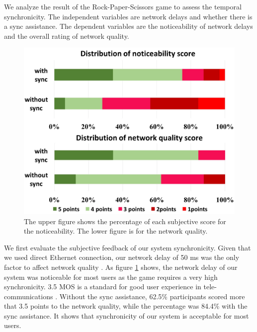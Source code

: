We analyze the result of the Rock-Paper-Scissors game to assess the temporal synchronicity. The independent variables are network delays and whether there is a sync assistance. The dependent variables are the noticeability of network delays and the overall rating of network quality.

\begin{figure}[!htbp]
\centering
\includegraphics[width=0.98\linewidth]{figures/figure7_1.jpg}
\setlength{\abovecaptionskip}{0.5cm}
\caption{The upper figure shows the percentage of each subjective score for the noticeability. The lower figure is for the network quality.}
\label{fig:subjective_rating_50ms}
\end{figure}

We first evaluate the subjective feedback of our system synchronicity. Given that we used direct Ethernet connection, our network delay of 50 ms was the only factor to affect network quality \cite{donovan2014understanding}. As figure \ref{fig:subjective_rating_50ms} shows, the network delay of our system was noticeable for most users as the game requires a very high synchronicity. 3.5 MOS is a standard for good user experience in tele-communications \cite{enderes2002impact, schaefer2002subjective}. Without the sync assistance, 62.5\% participants scored more that 3.5 points to the network quality, while the percentage was 84.4\% with the sync assistance. It shows that synchronicity of our system is acceptable for most users.

